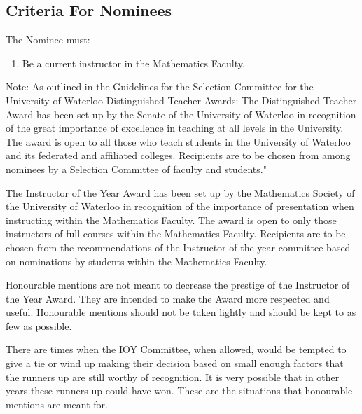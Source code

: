 \subsection{Criteria For Nominees}
The Nominee must:
\begin{enumerate}
\item Be a current instructor in the Mathematics Faculty.
\end{enumerate}

Note: As outlined in the Guidelines for the Selection Committee for the University of Waterloo Distinguished Teacher Awards: The Distinguished Teacher Award has been set up by the Senate of the University of Waterloo in recognition of the great importance of excellence in teaching at all levels in the University. The award is open to all those who teach students in the University of Waterloo and its federated and affiliated colleges. Recipients are to be chosen from among nominees by a Selection Committee of faculty and students."

The Instructor of the Year Award has been set up by the Mathematics Society of the University of Waterloo in recognition of the importance of presentation when instructing within the Mathematics Faculty. The award is open to only those instructors of full courses within the Mathematics Faculty. Recipients are to be chosen from the recommendations of the Instructor of the year committee based on nominations by students within the Mathematics Faculty.

Honourable mentions are not meant to decrease the prestige of the Instructor of the Year Award.  They are intended to make the Award more respected and useful.  Honourable mentions should not be taken lightly and should be kept to as few as possible.

There are times when the IOY Committee, when allowed, would be tempted to give a tie or wind up making their decision based on small enough factors that the runners up are still worthy of recognition.  It is very possible that in other years these runners up could have won.  These are the situations that honourable mentions are meant for.